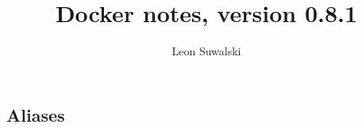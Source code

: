 \documentclass{charun}
\title{Docker notes, version 0.8.1}
\author{Leon Suwalski}
\begin{document}
\begin{multicols*}{2}
\maketitle
\raggedright









\section{Aliases}


\end{multicols*}
\end{document}
